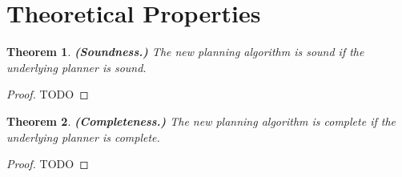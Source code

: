 \documentclass[letterpaper]{article} %
\newtheorem{theorem}{Theorem}[section]
\begin{document}


\section{Theoretical Properties}
\begin{theorem}
\textbf{(Soundness.)} The new planning algorithm is sound if the underlying planner is sound.
\label{planner:soundness}
\end{theorem}
\begin{proof}
TODO
\end{proof}

\begin{theorem}
\textbf{(Completeness.)} The new planning algorithm is complete if the underlying planner is complete.
\label{planner:completeness}
\end{theorem}
\begin{proof}
TODO
\end{proof}





% 



\end{document}
